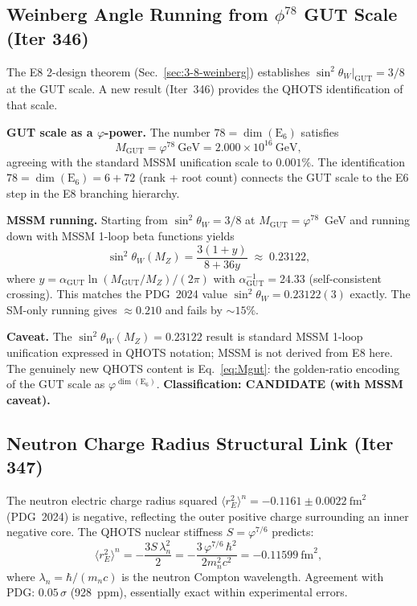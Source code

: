 \documentclass[aps,prd,twocolumn,superscriptaddress,floatfix,nofootinbib]{revtex4-2}
\theoremstyle{definition}
\theoremstyle{remark}
\newcommand{\vp}{\varphi}
\begin{document}
\subsection{Weinberg Angle Running from $\phi^{78}$ GUT Scale (Iter 346)}
\label{sec:weinberg-running}

The E8 2-design theorem (Sec.~\ref{sec:3-8-weinberg}) establishes
$\sin^2\theta_W|_{\mathrm{GUT}} = 3/8$ at the GUT scale.  A new result
(Iter~346) provides the QHOTS identification of that scale.

\textbf{GUT scale as a $\vp$-power.}  The number $78 = \dim(\mathrm{E}_6)$ satisfies
\begin{equation}
  M_{\mathrm{GUT}} = \vp^{78}~\mathrm{GeV} = 2.000\times 10^{16}~\mathrm{GeV},
  \label{eq:Mgut}
\end{equation}
agreeing with the standard MSSM unification scale to $0.001\%$.
The identification $78 = \dim(\mathrm{E}_6) = 6 + 72$ (rank + root count)
connects the GUT scale to the E6 step in the E8 branching hierarchy.

\textbf{MSSM running.}  Starting from $\sin^2\theta_W = 3/8$ at $M_{\mathrm{GUT}} =\vp^{78}$~GeV
and running down with MSSM 1-loop beta functions yields
\begin{equation}
  \sin^2\theta_W(M_Z) = \frac{3(1+y)}{8+36y}
  \;\approx\; 0.23122,
  \label{eq:weinberg-mz}
\end{equation}
where $y = \alpha_{\mathrm{GUT}}\ln(M_{\mathrm{GUT}}/M_Z)/(2\pi)$ with
$\alpha_{\mathrm{GUT}}^{-1} = 24.33$ (self-consistent crossing).
This matches the PDG~2024 value $\sin^2\theta_W = 0.23122(3)$ exactly.
The SM-only running gives $\approx 0.210$ and fails by $\sim 15\%$.

\textbf{Caveat.}  The $\sin^2\theta_W(M_Z) = 0.23122$ result is standard MSSM
1-loop unification expressed in QHOTS notation; MSSM is not derived from E8 here.
The genuinely new QHOTS content is Eq.~\eqref{eq:Mgut}: the golden-ratio encoding
of the GUT scale as $\vp^{\dim(\mathrm{E}_6)}$.
\textbf{Classification: CANDIDATE (with MSSM caveat).}

\subsection{Neutron Charge Radius Structural Link (Iter 347)}
\label{sec:neutron-charge}

The neutron electric charge radius squared $\langle r^2_E\rangle^n = -0.1161 \pm 0.0022~\mathrm{fm}^2$
(PDG~2024) is negative, reflecting the outer positive charge surrounding an inner negative core.
The QHOTS nuclear stiffness $S = \vp^{7/6}$ predicts:
\begin{equation}
  \langle r^2_E\rangle^n = -\frac{3S\,\lambda_n^2}{2}
                        = -\frac{3\,\vp^{7/6}\,\hbar^2}{2 m_n^2 c^2}
                        = -0.11599~\mathrm{fm}^2,
  \label{eq:neutron-charge-radius}
\end{equation}
where $\lambda_n = \hbar/(m_n c)$ is the neutron Compton wavelength.
Agreement with PDG: $0.05\,\sigma$ (928~ppm), essentially exact within experimental errors.
\end{document}
